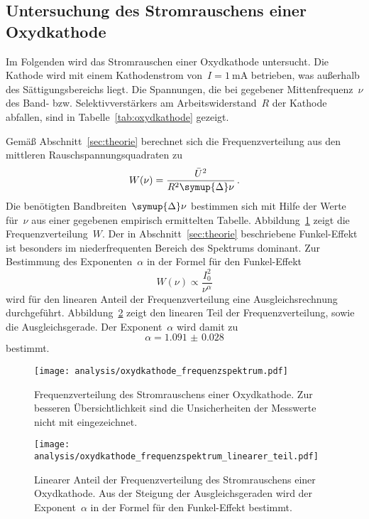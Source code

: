\subsection{Untersuchung des Stromrauschens einer Oxydkathode}

Im Folgenden wird das Stromrauschen einer Oxydkathode untersucht. Die
Kathode wird mit einem Kathodenstrom von~$I=\SI{1}{\milli\ampere}$ betrieben,
was außerhalb des Sättigungsbereichs liegt. Die Spannungen, die bei gegebener
Mittenfrequenz~$\nu$ des Band- bzw. Selektivverstärkers am Arbeitswiderstand~$R$
der Kathode abfallen, sind in Tabelle~\ref{tab:oxydkathode} gezeigt.

Gemäß Abschnitt~\ref{sec:theorie} berechnet sich die Frequenzverteilung aus den
mittleren Rauschspannungsquadraten zu
%
\begin{equation}
  W(\nu)=\frac{\bar{U}^2}{R^2\symup{\Delta}\nu} \, .
\end{equation}
%
Die benötigten Bandbreiten~$\symup{\Delta}\nu$ bestimmen sich mit Hilfe der
Werte für~$\nu$ aus einer gegebenen empirisch ermittelten Tabelle.
Abbildung~\ref{fig:oxydkathode_frequenzspektrum} zeigt die
Frequenzverteilung~$W$. Der in Abschnitt~\ref{sec:theorie} beschriebene
Funkel-Effekt ist besonders im niederfrequenten Bereich des Spektrums dominant.
Zur Bestimmung des Exponenten~$\alpha$ in der Formel für den Funkel-Effekt
%
\begin{equation}
  W(\nu)\propto\frac{I_0^2}{\nu^{\alpha}}
\end{equation}
%
wird für den linearen Anteil der Frequenzverteilung eine Ausgleichsrechnung
durchgeführt. Abbildung~\ref{fig:oxydkathode_frequenzspektrum_linearer_teil}
zeigt den linearen Teil der Frequenzverteilung, sowie die Ausgleichsgerade. Der
Exponent~$\alpha$ wird damit zu
%
\begin{equation}
  \alpha=\num{1.091(28)}
\end{equation}
%
bestimmt.

\begin{figure}[htb]
  \centering
  \texttt{[image: analysis/oxydkathode\_frequenzspektrum.pdf]}
  \caption{Frequenzverteilung des Stromrauschens einer Oxydkathode. Zur besseren
  Übersichtlichkeit sind die Unsicherheiten der Messwerte nicht mit
  eingezeichnet.}
  \label{fig:oxydkathode_frequenzspektrum}
\end{figure}

\begin{figure}[htb]
  \centering
  \texttt{[image: analysis/oxydkathode\_frequenzspektrum\_linearer\_teil.pdf]}
  \caption{Linearer Anteil der Frequenzverteilung des Stromrauschens einer
  Oxydkathode. Aus der Steigung der Ausgleichsgeraden wird der Exponent~$\alpha$
  in der Formel für den Funkel-Effekt bestimmt.}
  \label{fig:oxydkathode_frequenzspektrum_linearer_teil}
\end{figure}

